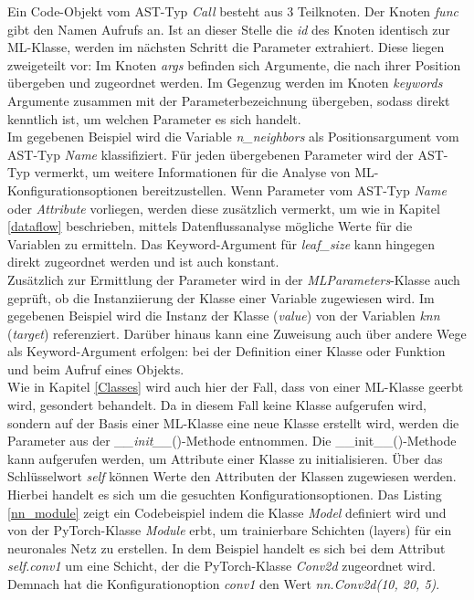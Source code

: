 \documentclass[german,bachelor]{swsLeipzig}
\begin{document}
\noindent Ein Code-Objekt vom AST-Typ \textit{Call} besteht aus 3 Teilknoten.
Der Knoten \textit{func} gibt den Namen Aufrufs an.
Ist an dieser Stelle die \textit{id} des Knoten identisch zur ML-Klasse, werden im nächsten Schritt die Parameter
extrahiert.
Diese liegen zweigeteilt vor:
Im Knoten \textit{args} befinden sich Argumente, die nach ihrer Position übergeben und zugeordnet werden.
Im Gegenzug werden im Knoten \textit{keywords} Argumente zusammen mit der Parameterbezeichnung übergeben, sodass direkt kenntlich
ist, um welchen Parameter es sich handelt. \\
\indent Im gegebenen Beispiel wird die Variable \textit{n\_neighbors} als Positionsargument vom AST-Typ \textit{Name} klassifiziert.
Für jeden übergebenen Parameter wird der AST-Typ vermerkt, um weitere Informationen für die Analyse von ML-Konfigurationsoptionen
bereitzustellen.
Wenn Parameter vom AST-Typ \textit{Name} oder \textit{Attribute} vorliegen, werden diese zusätzlich vermerkt, um wie
in Kapitel \ref{dataflow} beschrieben, mittels Datenflussanalyse mögliche Werte für die Variablen zu ermitteln.
Das Keyword-Argument für \textit{leaf\_size} kann hingegen direkt zugeordnet werden und ist auch konstant. \\
\indent Zusätzlich zur Ermittlung der Parameter wird in der \textit{MLParameters}-Klasse auch geprüft, ob die Instanziierung der Klasse
einer Variable zugewiesen wird.
Im gegebenen Beispiel wird die Instanz der Klasse (\textit{value}) von der Variablen \textit{knn} (\textit{target}) referenziert.
Darüber hinaus kann eine Zuweisung auch über andere Wege als Keyword-Argument erfolgen:
bei der Definition einer Klasse oder Funktion und beim Aufruf eines Objekts.\\
\indent Wie in Kapitel \ref{Classes} wird auch hier der Fall, dass von einer ML-Klasse geerbt wird, gesondert behandelt.
Da in diesem Fall keine Klasse aufgerufen wird, sondern auf der Basis einer ML-Klasse eine neue Klasse erstellt wird, werden die Parameter aus der
\textit{\_\_init\_\_}()-Methode entnommen.
Die \_\_init\_\_()-Methode kann aufgerufen werden, um Attribute einer Klasse zu initialisieren.
Über das Schlüsselwort \textit{self} können Werte den Attributen der Klassen zugewiesen werden.
Hierbei handelt es sich um die gesuchten Konfigurationsoptionen.
Das Listing \ref{nn_module} zeigt ein Codebeispiel indem die Klasse \textit{Model} definiert wird und
von der PyTorch-Klasse \textit{Module} erbt, um trainierbare Schichten (layers) für ein neuronales Netz zu erstellen.
In dem Beispiel handelt es sich bei dem Attribut \textit{self.conv1} um eine Schicht, der die PyTorch-Klasse \textit{Conv2d}
zugeordnet wird.
Demnach hat die Konfigurationoption \textit{conv1} den Wert \textit{nn.Conv2d(10, 20, 5)}.\\
\end{document}
